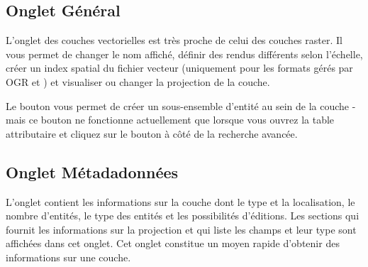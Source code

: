 \subsection{Onglet Général}\label{vectorgeneraltab}
L'onglet  des couches vectorielles est très proche de celui des couches raster. Il vous permet de changer le nom affiché, définir des rendus différents selon l'échelle, créer un index spatial du fichier vecteur (uniquement pour les formats gérés par OGR et \pg) et visualiser ou changer la projection de la couche.

Le bouton  vous permet de créer un sous-ensemble d'entité au sein de la couche - mais ce bouton ne fonctionne actuellement que lorsque vous ouvrez la table attributaire et cliquez sur le bouton \button{\dots} à côté de la recherche avancée.

\subsection{Onglet Métadadonnées}

L'onglet  contient les informations sur la couche dont le type et la localisation, le nombre d'entités, le type des entités et les possibilités d'éditions. Les sections  qui fournit les informations sur la projection et  qui liste les champs et leur type sont affichées dans cet onglet. Cet onglet constitue un moyen rapide d'obtenir des informations sur une couche.

